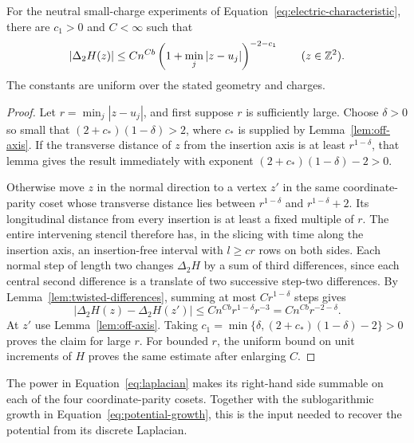 \begin{proposition}\label{prop:laplacian}
For the neutral small-charge experiments of
Equation~\eqref{eq:electric-characteristic}, there are $c_1>0$ and
$C<\infty$ such that
\begin{equation}\label{eq:laplacian}
 |\Delta_2H(z)|\le C n^{Cb}
       \left(1+\min_j|z-u_j|\right)^{-2-c_1}
 \qquad(z\in\mathbb Z^2).
\end{equation}
The constants are uniform over the stated geometry and charges.
\end{proposition}

\begin{proof}
Let $r=\min_j|z-u_j|$, and first suppose $r$ is sufficiently large.
Choose $\delta>0$ so small that
$(2+c_*)(1-\delta)>2$, where $c_*$ is supplied by
Lemma~\ref{lem:off-axis}.  If the transverse distance of $z$ from
the insertion axis is at least $r^{1-\delta}$, that lemma gives
the result immediately with exponent
$(2+c_*)(1-\delta)-2>0$.

Otherwise move $z$ in the normal direction to a vertex $z'$ in
the same coordinate-parity coset whose transverse distance lies
between $r^{1-\delta}$ and $r^{1-\delta}+2$.  Its longitudinal
distance from every insertion is at least a fixed multiple of $r$.
The entire intervening stencil therefore has, in the slicing with
time along the insertion axis, an insertion-free interval with
$l\ge c r$ rows on both sides.  Each normal step of length two
changes $\Delta_2H$ by a sum of third differences, since each
central second difference is a translate of two successive
step-two differences.  By
Lemma~\ref{lem:twisted-differences}, summing at most
$C r^{1-\delta}$ steps gives
\[
 |\Delta_2H(z)-\Delta_2H(z')|
 \le C n^{Cb}r^{1-\delta}r^{-3}
 =C n^{Cb}r^{-2-\delta}.
\]
At $z'$ use Lemma~\ref{lem:off-axis}.  Taking
$c_1=\min\{\delta,(2+c_*)(1-\delta)-2\}>0$ proves the claim for
large $r$.  For bounded $r$, the uniform bound on unit increments
of $H$ proves the same estimate after enlarging $C$.
\end{proof}

The power in Equation~\eqref{eq:laplacian} makes its right-hand side
summable on each of the four coordinate-parity cosets.  Together
with the sublogarithmic growth in
Equation~\eqref{eq:potential-growth}, this is the input needed to
recover the potential from its discrete Laplacian.
